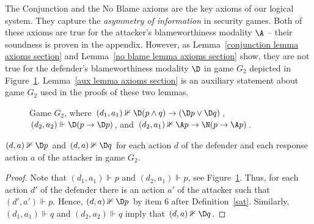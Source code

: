 \documentclass[letterpaper]{article}
\begin{document}
The Conjunction and the No Blame axioms are the key axioms of our logical system. They capture the {\em asymmetry of information} in security games. Both of these axioms are true for the attacker's blameworthiness modality $\A$ -- their soundness is proven in the appendix. However, as Lemma~\ref{conjunction lemma axioms section} and Lemma~\ref{no blame lemma axioms section} show, they are not true for the defender's blameworthiness modality $\D$ in game $G_2$ depicted in Figure~\ref{conjunction-axiom figure}. Lemma~\ref{aux lemma axioms section} is an auxiliary statement about game $G_2$ used in the proofs of these two lemmas.


\begin{figure}[ht]
\begin{center}
\caption{Game $G_2$, where $(d_1,a_1)\nVdash \D(p\wedge q)\to(\D p\vee\D q)$, $(d_2,a_2)\Vdash \D(p\to\D p)$, and $(d_2,a_1)\nVdash \A p \to \N(p\to \A p)$.}\label{conjunction-axiom figure}
\end{center}
\end{figure}

\begin{lemma}\label{aux lemma axioms section}
$(d,a)\nVdash\D p$ and $(d,a)\nVdash\D q$ for each action $d$ of the defender and each response action $a$ of the attacker in game $G_2$.
\end{lemma}
\begin{proof}
Note that  $(d_1,a_1)\Vdash p$ and $(d_2,a_1)\Vdash p$, see Figure~\ref{conjunction-axiom figure}. Thus, for each action $d'$ of the defender there is an action $a'$ of the attacker such that $(d',a')\Vdash p$. Hence, $(d,a)\nVdash \D p$ by item 6 after Definition~\ref{sat}. Similarly, $(d_1,a_1)\Vdash q$ and $(d_2,a_2)\Vdash q$ imply that $(d,a)\nVdash \D q$.
\end{proof}
\end{document}
